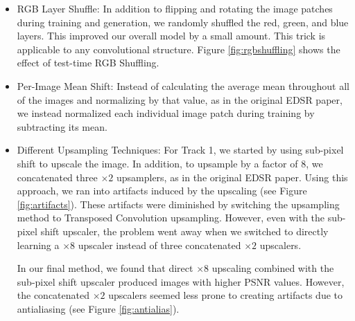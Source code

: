 \documentclass[10pt,twocolumn,letterpaper]{article}
\begin{document}
\begin{itemize}
	\item RGB Layer Shuffle: In addition to flipping and rotating the image patches during training and generation, we randomly shuffled the red, green, and blue layers. This improved our overall model by a small amount. This trick is applicable to any convolutional structure. Figure \ref{fig:rgbshuffling} shows the effect of test-time RGB Shuffling.
	\item Per-Image Mean Shift: Instead of calculating the average mean throughout all of the images and normalizing by that value, as in the original EDSR paper, we instead normalized each individual image patch during training by subtracting its mean.
	\item Different Upsampling Techniques: For Track 1, we started by using sub-pixel shift to upscale the image. In addition, to upsample by a factor of $8$, we concatenated three $\times 2$ upsamplers, as in the original EDSR paper. Using this approach, we ran into artifacts induced by the upscaling (see Figure \ref{fig:artifacts}). These artifacts were diminished by switching the upsampling method to Transposed Convolution upsampling. However, even with the sub-pixel shift upscaler, the problem went away when we switched to directly learning a $\times 8$ upscaler instead of three concatenated $\times 2$ upscalers.
	
	In our final method, we found that direct $\times 8$ upscaling combined with the sub-pixel shift upscaler produced images with higher PSNR values. However, the concatenated $\times 2$ upscalers seemed less prone to creating artifacts due to antialiasing (see Figure \ref{fig:antialias}).
	

\end{itemize}
\end{document}
